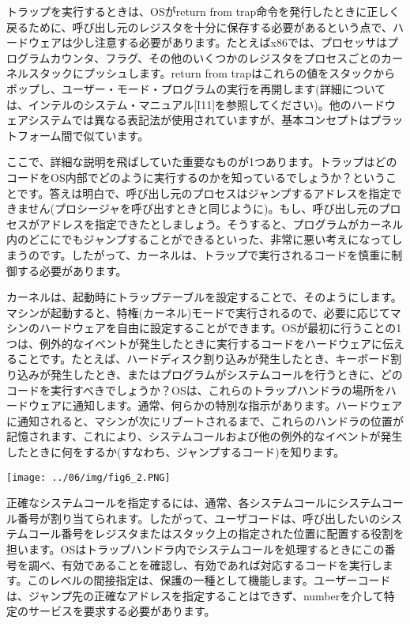 トラップを実行するときは、OSがreturn from
trap命令を発行したときに正しく戻るために、呼び出し元のレジスタを十分に保存する必要があるという点で、ハードウェアは少し注意する必要があります。たとえばx86では、プロセッサはプログラムカウンタ、フラグ、その他のいくつかのレジスタをプロセスごとのカーネルスタックにプッシュします。return
from
trapはこれらの値をスタックからポップし、ユーザー・モード・プログラムの実行を再開します(詳細については、インテルのシステム・マニュアル{[}I11{]}を参照してください)。他のハードウェアシステムでは異なる表記法が使用されていますが、基本コンセプトはプラットフォーム間で似ています。

ここで、詳細な説明を飛ばしていた重要なものが1つあります。トラップはどのコードをOS内部でどのように実行するのかを知っているでしょうか？ということです。答えは明白で、呼び出し元のプロセスはジャンプするアドレスを指定できません(プロシージャを呼び出すときと同じように)。もし、呼び出し元のプロセスがアドレスを指定できたとしましょう。そうすると、プログラムがカーネル内のどこにでもジャンプすることができるといった、非常に悪い考えになってしまうのです。したがって、カーネルは、トラップで実行されるコードを慎重に制御する必要があります。

カーネルは、起動時にトラップテーブルを設定することで、そのようにします。マシンが起動すると、特権(カーネル)モードで実行されるので、必要に応じてマシンのハードウェアを自由に設定することができます。OSが最初に行うことの1つは、例外的なイベントが発生したときに実行するコードをハードウェアに伝えることです。たとえば、ハードディスク割り込みが発生したとき、キーボード割り込みが発生したとき、またはプログラムがシステムコールを行うときに、どのコードを実行すべきでしょうか？OSは、これらのトラップハンドラの場所をハードウェアに通知します。通常、何らかの特別な指示があります。ハードウェアに通知されると、マシンが次にリブートされるまで、これらのハンドラの位置が記憶されます、これにより、システムコールおよび他の例外的なイベントが発生したときに何をするか(すなわち、ジャンプするコード)を知ります。

\texttt{[image: ../06/img/fig6\_2.PNG]}

正確なシステムコールを指定するには、通常、各システムコールにシステムコール番号が割り当てられます。したがって、ユーザコードは、呼び出したいのシステムコール番号をレジスタまたはスタック上の指定された位置に配置する役割を担います。OSはトラップハンドラ内でシステムコールを処理するときにこの番号を調べ、有効であることを確認し、有効であれば対応するコードを実行します。このレベルの間接指定は、保護の一種として機能します。ユーザーコードは、ジャンプ先の正確なアドレスを指定することはできず、numberを介して特定のサービスを要求する必要があります。

